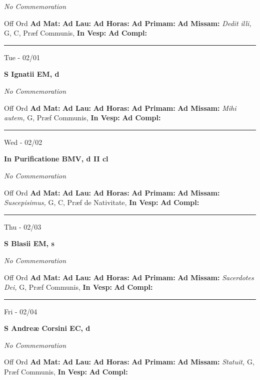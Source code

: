 \documentclass[letterpaper, 10pt]{article}
\begin{document}
\textit{No Commemoration}\begin{justify}
Off Ord
\textbf{Ad Mat: }
\textbf{Ad Lau: }
\textbf{Ad Horas: }
\textbf{Ad Primam: }
\textbf{Ad Missam:} \textit{Dedit illi, } G, C, Præf Communis, 
\textbf{In Vesp: }
\textbf{Ad Compl: }\end{justify}



\hrule
\begin{center}
Tue - 02/01
\end{center}\textbf{ \large S Ignatii EM, \textnormal{\normalsize d}}

\textit{No Commemoration}\begin{justify}
Off Ord
\textbf{Ad Mat: }
\textbf{Ad Lau: }
\textbf{Ad Horas: }
\textbf{Ad Primam: }
\textbf{Ad Missam:} \textit{Mihi autem, } G, Præf Communis, 
\textbf{In Vesp: }
\textbf{Ad Compl: }\end{justify}



\hrule
\begin{center}
Wed - 02/02
\end{center}\textbf{ \large In Purificatione BMV, \textnormal{\normalsize d II cl}}

\textit{No Commemoration}\begin{justify}
Off Ord
\textbf{Ad Mat: }
\textbf{Ad Lau: }
\textbf{Ad Horas: }
\textbf{Ad Primam: }
\textbf{Ad Missam:} \textit{Suscepisimus, } G, C, Præf de Nativitate, 
\textbf{In Vesp: }
\textbf{Ad Compl: }\end{justify}



\hrule
\begin{center}
Thu - 02/03
\end{center}\textbf{ \large S Blasii EM, \textnormal{\normalsize s}}

\textit{No Commemoration}\begin{justify}
Off Ord
\textbf{Ad Mat: }
\textbf{Ad Lau: }
\textbf{Ad Horas: }
\textbf{Ad Primam: }
\textbf{Ad Missam:} \textit{Sacerdotes Dei, } G, Præf Communis, 
\textbf{In Vesp: }
\textbf{Ad Compl: }\end{justify}



\hrule
\begin{center}
Fri - 02/04
\end{center}\textbf{ \large S Andreæ Corsini EC, \textnormal{\normalsize d}}

\textit{No Commemoration}\begin{justify}
Off Ord
\textbf{Ad Mat: }
\textbf{Ad Lau: }
\textbf{Ad Horas: }
\textbf{Ad Primam: }
\textbf{Ad Missam:} \textit{Statuit, } G, Præf Communis, 
\textbf{In Vesp: }
\textbf{Ad Compl: }\end{justify}
\end{document}
